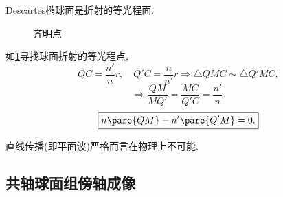 \documentclass{ctexart}
\begin{document}
\begin{remark}
    Descartes椭球面是折射的等光程面.
\end{remark}
\begin{figure}[ht]
    \centering
    \caption{齐明点}
    \label{fig:齐明点}
\end{figure}
\begin{sample}
    \begin{ex}[齐明点]如\cref{fig:齐明点}寻找球面折射的等光程点,
        \[ QC = \frac{n'}{n}r,\quad Q'C = \frac{n}{n'}r \Rightarrow \bigtriangleup QMC \sim \bigtriangleup Q'MC, \]
        \[ \Rightarrow \frac{QM}{MQ'} = \frac{MC}{Q'C} = \frac{n'}{n}. \]
        \[ \boxed{n\pare{QM} - n'\pare{Q'M} = 0.} \]
    \end{ex}
\end{sample}
\begin{remark}
    直线传播(即平面波)严格而言在物理上不可能.
\end{remark}


\subsection{共轴球面组傍轴成像} %
\label{sub:共轴球面组傍轴成像}
\end{document}
